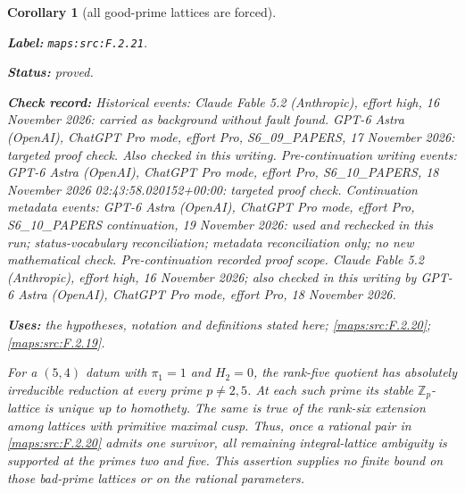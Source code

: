 \documentclass[11pt,a4paper]{article}
\newtheorem{corollary}[corollary]{Corollary}
\theoremstyle{definition}
\newcommand{\StatementRecord}[4]{\par\smallskip\begingroup\upshape\raggedright\noindent\textbf{Label:} \nolinkurl{#1}.\par\noindent\textbf{Status:} #2.\par\noindent\textbf{Check record:} #3.\par\noindent\textbf{Uses:} #4.\par\endgroup\smallskip}
\begin{document}
\begin{corollary}[all good-prime lattices are forced]\label{maps:src:F.2.21}
\StatementRecord{maps:src:F.2.21}{proved}{Historical events: Claude Fable 5.2 (Anthropic), effort high, 16 November 2026: carried as background without fault found. GPT-6 Astra (OpenAI), ChatGPT Pro mode, effort Pro, S6\_09\_PAPERS, 17 November 2026: targeted proof check. Also checked in this writing. Pre-continuation writing events: GPT-6 Astra (OpenAI), ChatGPT Pro mode, effort Pro, S6\_10\_PAPERS, 18 November 2026 02:43:58.020152+00:00: targeted proof check. Continuation metadata events: GPT-6 Astra (OpenAI), ChatGPT Pro mode, effort Pro, S6\_10\_PAPERS continuation, 19 November 2026: used and rechecked in this run; status-vocabulary reconciliation; metadata reconciliation only; no new mathematical check. \emph{Pre-continuation recorded proof scope.} Claude Fable 5.2 (Anthropic), effort high, 16 November 2026; also checked in this writing by GPT-6 Astra (OpenAI), ChatGPT Pro mode, effort Pro, 18 November 2026}{the hypotheses, notation and definitions stated here; \cref{maps:src:F.2.20}; \cref{maps:src:F.2.19}}


For a $(5,4)$ datum with $\pi_1=1$ and $H_2=0$, the
rank-five quotient has absolutely irreducible reduction
at every prime $p\ne2,5$.  At each such prime its stable
$\mathbb Z_p$-lattice is unique up to homothety.
The same is true of the rank-six extension among lattices
with primitive maximal cusp.  Thus, once a rational pair
in \ref{maps:src:F.2.20} admits one survivor, all remaining integral-lattice
ambiguity is supported at the primes two and five.
This assertion supplies no finite bound on those bad-prime
lattices or on the rational parameters.

\end{corollary}
\end{document}
